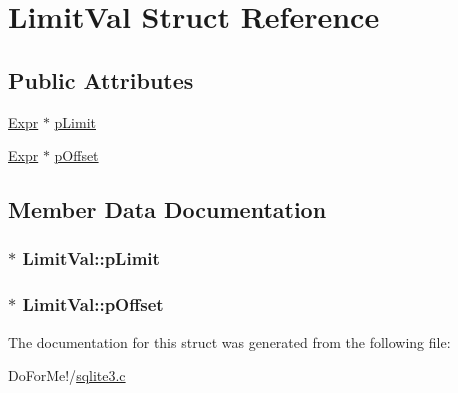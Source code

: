 \hypertarget{struct_limit_val}{\section{Limit\-Val Struct Reference}
\label{struct_limit_val}
}
\subsection*{Public Attributes}
\begin{DoxyCompactItemize}
\item 
\hyperlink{struct_expr}{Expr} $\ast$ \hyperlink{struct_limit_val_a96094d1b395a3f455263ff5907d72ed6}{p\-Limit}
\item 
\hyperlink{struct_expr}{Expr} $\ast$ \hyperlink{struct_limit_val_a43dedf453a8e5cb8091fcde524a7c736}{p\-Offset}
\end{DoxyCompactItemize}


\subsection{Member Data Documentation}
\hypertarget{struct_limit_val_a96094d1b395a3f455263ff5907d72ed6}{
\subsubsection[{p\-Limit}]{$\ast$ Limit\-Val\-::p\-Limit}}\label{struct_limit_val_a96094d1b395a3f455263ff5907d72ed6}
\hypertarget{struct_limit_val_a43dedf453a8e5cb8091fcde524a7c736}{
\subsubsection[{p\-Offset}]{$\ast$ Limit\-Val\-::p\-Offset}}\label{struct_limit_val_a43dedf453a8e5cb8091fcde524a7c736}


The documentation for this struct was generated from the following file\-:\begin{DoxyCompactItemize}
\item 
Do\-For\-Me!/\hyperlink{sqlite3_8c}{sqlite3.\-c}\end{DoxyCompactItemize}
